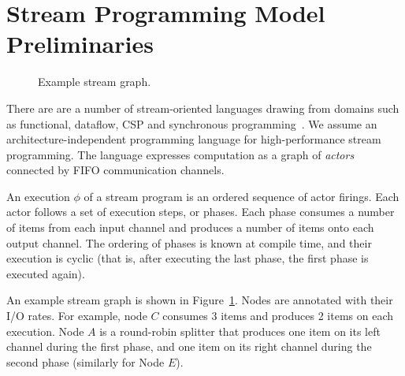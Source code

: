 \section{Stream Programming Model Preliminaries}


\begin{figure}[t]
\begin{center}
\vspace{9pt}
\caption{{\small Example stream graph.
\protect\label{fig:stream-rates}}}
\end{center}
\vspace{-26pt}
\end{figure}

There are are a number of stream-oriented languages drawing from
domains such as functional, dataflow, CSP and synchronous
programming~\cite{survey97}. We assume an architecture-independent
programming language for high-performance stream programming. The
language expresses computation as a graph of {\it actors} connected by
FIFO communication channels.

An execution $\phi$ of a stream program is an ordered sequence of
actor firings. Each actor follows a set of execution steps, or
phases. Each phase consumes a number of items from each input channel
and produces a number of items onto each output channel. The  ordering
of phases is known at compile time, and their execution is cyclic
(that is, after executing the last phase, the first phase is executed
again).

An example stream graph is shown in Figure~\ref{fig:stream-rates}.
Nodes are annotated with their I/O rates. For example, node $C$
consumes 3 items and produces 2 items on each execution. Node $A$ is a
round-robin splitter that produces one item on its left channel during
the first phase, and one item on its right channel during the second
phase (similarly for Node $E$).


